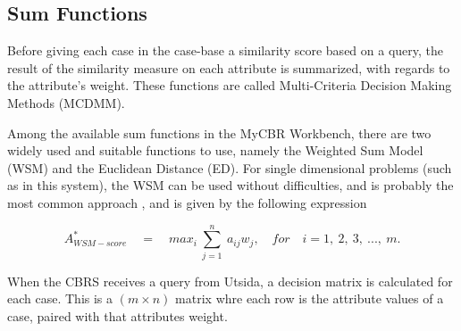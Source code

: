 \subsection{Sum Functions}
Before giving each case in the case-base a similarity score based on a query, the result of the similarity measure on each attribute is summarized, with regards to the attribute's weight. These functions are called Multi-Criteria Decision Making Methods (MCDMM).

Among the available sum functions in the MyCBR Workbench, there are two widely used and suitable functions to use, namely the Weighted Sum Model (WSM) and the Euclidean Distance (ED). For single dimensional problems (such as in this system), the WSM can be used without difficulties, and is probably the most common approach \cite{triantaphyllou2000multi}, and is given by the following expression \cite{fishburn1967letter}

\begin{displaymath}
    A^{*}_{WSM-score}\quad =\quad max_{i}\  \sum\limits_{j = 1}^{n}\  a_{ij}w_{j},\quad for \quad i =1,\ 2,\ 3,\ ...,\ m.
\end{displaymath}

When the CBRS receives a query from Utsida, a decision matrix is calculated for each case. This is a $(m \times n)$ matrix whre each row is the attribute values of a case, paired with that attributes weight. 


